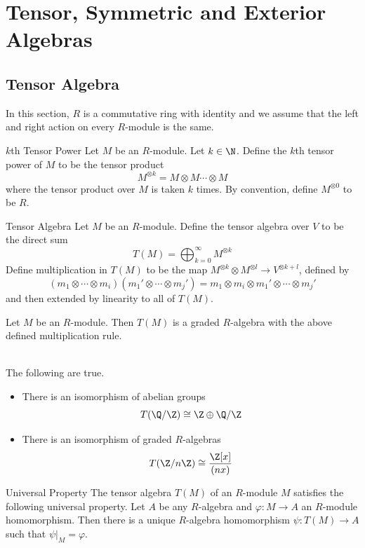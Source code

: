 \documentclass[a4paper]{article}
\begin{document}
\pagebreak
\section{Tensor, Symmetric and Exterior Algebras}
\subsection{Tensor Algebra}
In this section, $R$ is a commutative ring with identity and we assume that the left and right action on every $R$-module is the same. 

\begin{defn}{$k$th Tensor Power}{} Let $M$ be an $R$-module. Let $k\in\N$. Define the $k$th tensor power of $M$ to be the tensor product $$M^{\otimes k}=M\otimes M\cdots\otimes M$$ where the tensor product over $M$ is taken $k$ times. By convention, define $M^{\otimes 0}$ to be $R$. 
\end{defn}

\begin{defn}{Tensor Algebra}{} Let $M$ be an $R$-module. Define the tensor algebra over $V$ to be the direct sum $$T(M)=\bigoplus_{k=0}^\infty M^{\otimes k}$$ Define multiplication in $T(M)$ to be the map $M^{\otimes k}\otimes M^{\otimes l}\to V^{\otimes k+l}$, defined by $$(m_1\otimes\cdots\otimes m_i)(m_1'\otimes\cdots\otimes m_j')=m_1\otimes m_i\otimes m_1'\otimes\cdots\otimes m_j'$$ and then extended by linearity to all of $T(M)$. 
\end{defn}

\begin{prp}{}{} Let $M$ be an $R$-module. Then $T(M)$ is a graded $R$-algebra with the above defined multiplication rule. 
\end{prp}

\begin{eg}{}{}\\
The following are true. 
\begin{itemize}
\item There is an isomorphism of abelian groups $$T(\Q/\Z)\cong\Z\oplus\Q/\Z$$
\item There is an isomorphism of graded $R$-algebras $$T(\Z/n\Z)\cong\frac{\Z[x]}{(nx)}$$
\end{itemize}
\end{eg}

\begin{prp}{Universal Property}{} The tensor algebra $T(M)$ of an $R$-module $M$ satisfies the following universal property. Let $A$ be any $R$-algebra and $\varphi:M\to A$ an $R$-module homomorphism. Then there is a unique $R$-algebra homomorphism $\psi:T(M)\to A$ such that $\psi|_M=\varphi$. 
\end{prp}
\end{document}
